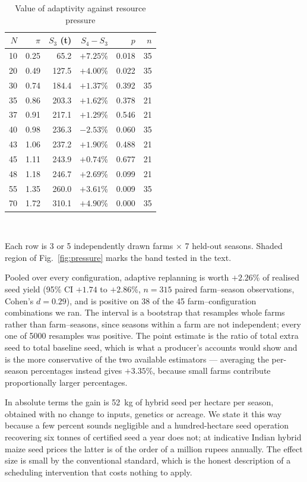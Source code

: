 \documentclass[10pt,twocolumn]{article}
\begin{document}
\begin{table}[t]
\centering
\caption{Value of adaptivity against resource pressure}
\label{tab:pressure}
\begin{tabular}{rrrrrr}
\hline
$N$ & $\pi$ & $S_3$ (t) & $S_4-S_3$ & $p$ & $n$ \\
\hline
10 & 0.25 & 65.2 & $+7.25$\% & 0.018 & 35 \\
20 & 0.49 & 127.5 & $+4.00$\% & 0.022 & 35 \\
30 & 0.74 & 184.4 & $+1.37$\% & 0.392 & 35 \\
35 & 0.86 & 203.3 & $+1.62$\% & 0.378 & 21 \\
37 & 0.91 & 217.1 & $+1.29$\% & 0.546 & 21 \\
40 & 0.98 & 236.3 & $-2.53$\% & 0.060 & 35 \\
43 & 1.06 & 237.2 & $+1.90$\% & 0.488 & 21 \\
45 & 1.11 & 243.9 & $+0.74$\% & 0.677 & 21 \\
48 & 1.18 & 246.7 & $+2.69$\% & 0.099 & 21 \\
55 & 1.35 & 260.0 & $+3.61$\% & 0.009 & 35 \\
70 & 1.72 & 310.1 & $+4.90$\% & 0.000 & 35 \\
\hline
\end{tabular}
\\[2pt]
\footnotesize\raggedright Each row is 3 or 5 independently drawn
farms $\times$ 7 held-out seasons. Shaded region of
Fig.~\ref{fig:pressure} marks the band tested in the text.
\end{table}

Pooled over every configuration, adaptive replanning is worth
$+2.26$\% of realised seed yield
(95\% CI $+1.74$ to $+2.86$\%,
$n = 315$ paired farm--season observations,
Cohen's $d = 0.29$), and is positive on
38 of the 45 farm--configuration combinations
we ran. The interval is a bootstrap that resamples whole farms
rather than farm--seasons, since seasons within a farm are not
independent; every one of 5000 resamples was positive. The point
estimate is the ratio of total extra seed to total baseline
seed, which is what a producer's accounts would show and is the
more conservative of the two available estimators --- averaging
the per-season percentages instead gives $+3.35$\%, because
small farms contribute proportionally larger percentages.

In absolute terms the gain is
52~kg of hybrid seed per hectare per
season, obtained with no change to inputs, genetics or acreage.
We state it this way because a few percent sounds negligible and
a hundred-hectare seed operation recovering six tonnes of
certified seed a year does not; at indicative Indian hybrid maize
seed prices the latter is of the order of a million rupees
annually. The effect size is small by the conventional standard,
which is the honest description of a scheduling intervention that
costs nothing to apply.
\end{document}
